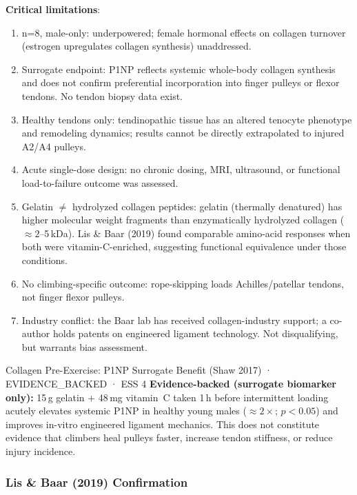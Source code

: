\textbf{Critical limitations}:
\begin{enumerate}[noitemsep]
  \item n=8, male-only: underpowered; female hormonal effects on collagen turnover (estrogen upregulates collagen synthesis) unaddressed.
  \item Surrogate endpoint: P1NP reflects systemic whole-body collagen synthesis and does not confirm preferential incorporation into finger pulleys or flexor tendons. No tendon biopsy data exist.
  \item Healthy tendons only: tendinopathic tissue has an altered tenocyte phenotype and remodeling dynamics; results cannot be directly extrapolated to injured A2/A4 pulleys.
  \item Acute single-dose design: no chronic dosing, MRI, ultrasound, or functional load-to-failure outcome was assessed.
  \item Gelatin $\ne$ hydrolyzed collagen peptides: gelatin (thermally denatured) has higher molecular weight fragments than enzymatically hydrolyzed collagen (${\approx}2$--5\,kDa). Lis \& Baar (2019) found comparable amino-acid responses when both were vitamin-C-enriched, suggesting functional equivalence under those conditions.
  \item No climbing-specific outcome: rope-skipping loads Achilles/patellar tendons, not finger flexor pulleys.
  \item Industry conflict: the Baar lab has received collagen-industry support; a co-author holds patents on engineered ligament technology. Not disqualifying, but warrants bias assessment.
\end{enumerate}

\begin{evidencebox}{Collagen Pre-Exercise: P1NP Surrogate Benefit (Shaw 2017) · EVIDENCE\_BACKED · ESS 4}
\textbf{Evidence-backed (surrogate biomarker only):} 15\,g gelatin $+$ 48\,mg vitamin~C taken 1\,h before intermittent loading acutely elevates systemic P1NP in healthy young males (${\approx}2{\times}$; $p{<}0.05$) and improves in-vitro engineered ligament mechanics. This does not constitute evidence that climbers heal pulleys faster, increase tendon stiffness, or reduce injury incidence.
\end{evidencebox}

\subsubsection{Lis \& Baar (2019) Confirmation}

